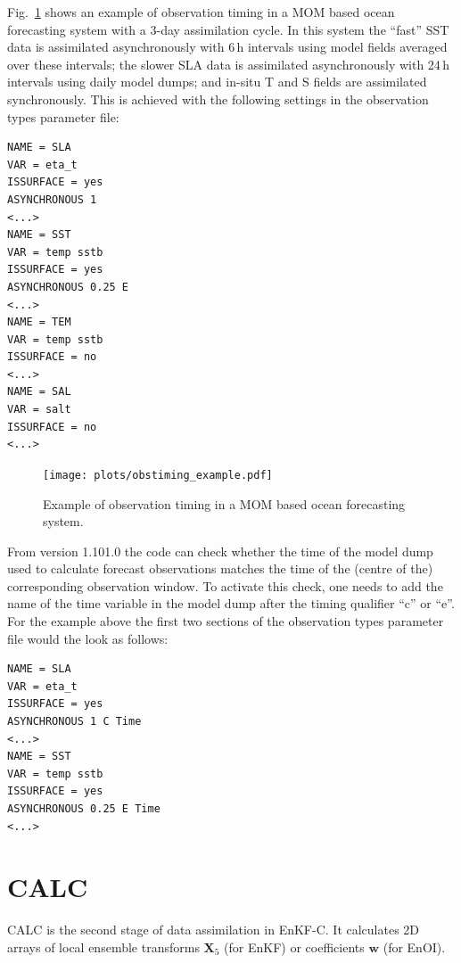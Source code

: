 \documentclass[11pt]{report}
\newcommand{\mb} {\mathbf}
\begin{document}
Fig.~\ref{fig:mom_timing} shows an example of observation timing in a MOM based ocean forecasting system with a 3-day assimilation cycle.
In this system the ``fast'' SST data is assimilated asynchronously with 6\,h intervals using model fields averaged over these intervals; the slower SLA data is assimilated asynchronously with 24\,h intervals using daily model dumps; and in-situ T and S fields are assimilated synchronously.
This is achieved with the following settings in the observation types parameter file:
\begin{Verbatim}[frame=single,fontsize=\footnotesize]
NAME = SLA
VAR = eta_t
ISSURFACE = yes
ASYNCHRONOUS 1
<...>
NAME = SST
VAR = temp sstb
ISSURFACE = yes
ASYNCHRONOUS 0.25 E
<...>
NAME = TEM
VAR = temp sstb
ISSURFACE = no
<...>
NAME = SAL
VAR = salt
ISSURFACE = no
<...>
\end{Verbatim}
\begin{figure}[h]
  \centering
  \texttt{[image: plots/obstiming\_example.pdf]}
  \caption{Example of observation timing in a MOM based ocean forecasting system.}
  \label{fig:mom_timing}
\end{figure}

From version 1.101.0 the code can check whether the time of the model dump used to calculate forecast observations matches the time of the (centre of the) corresponding observation window.
To activate this check, one needs to add the name of the time variable in the model dump after the timing qualifier ``c'' or ``e''.
For the example above the first two sections of the observation types parameter file would the look as follows:
\begin{Verbatim}[frame=single,fontsize=\footnotesize]
NAME = SLA
VAR = eta_t
ISSURFACE = yes
ASYNCHRONOUS 1 C Time
<...>
NAME = SST
VAR = temp sstb
ISSURFACE = yes
ASYNCHRONOUS 0.25 E Time
<...>
\end{Verbatim}

\section{CALC}

CALC is the second stage of data assimilation in EnKF-C.
It calculates 2D arrays of local ensemble transforms $\mb X_5$ (for EnKF) or coefficients $\mb w$ (for EnOI).
\end{document}
